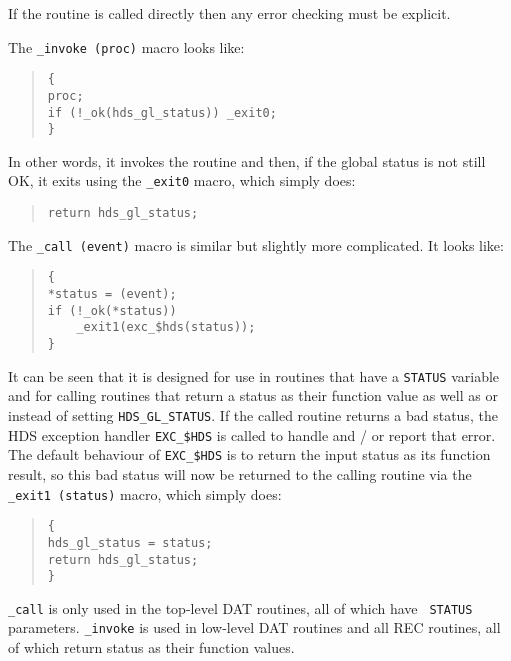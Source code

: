 If the routine is called directly then any error checking must be explicit.

The {\tt \_invoke (proc)} macro looks like:

\begin {quote}
\begin {verbatim}
{
proc;
if (!_ok(hds_gl_status)) _exit0;
}
\end{verbatim}
\end {quote}

In other words, it invokes the routine and then, if the global status is
not still OK, it exits using the {\tt \_exit0} macro, which simply does:

\begin {quote}
\begin {verbatim}
return hds_gl_status;
\end{verbatim}
\end {quote}

The {\tt \_call (event)} macro is similar but slightly more complicated. It
looks like:

\begin {quote}
\begin {verbatim}
{
*status = (event);
if (!_ok(*status))
    _exit1(exc_$hds(status));
}
\end{verbatim}
\end {quote}

It can be seen that it is designed for use in routines that have a {\tt STATUS}
variable and for calling routines that return a status as their function value
as well as or instead of setting {\tt HDS\_GL\_STATUS}. If the called routine
returns a bad status, the HDS exception handler {\tt EXC\_\$HDS} is called to
handle and / or report that error. The default behaviour of {\tt EXC\_\$HDS} is
to return the input status as its function result, so this bad status will now
be returned to the calling routine via the {\tt \_exit1 (status)} macro, which
simply does:

\begin {quote}
\begin {verbatim}
{
hds_gl_status = status;
return hds_gl_status;
}
\end{verbatim}
\end {quote}

{\tt \_call} is only used in the top-level DAT routines, all of which have {\tt
STATUS} parameters. {\tt \_invoke} is used in low-level DAT routines and all
REC routines, all of which return status as their function values.


